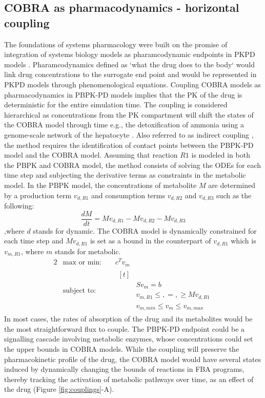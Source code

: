 \subsection{COBRA as pharmacodynamics - horizontal coupling}
The foundations of systems pharmacology were built on the promise of integration of systems biology models as pharamcodynamic endpoints in PKPD models \cite{iyengar2012merging,danhof2016systems}. Pharamcodynamics defined as `what the drug does to the body` would link drug concentrations to the surrogate end point and would be represented in PKPD models through phenomenological equations. Coupling COBRA models as pharmacodynamics in PBPK-PD models implies that the PK of the drug is deterministic for the entire simulation time. The coupling is considered hierarchical as concentrations from the PK compartment will shift the states of the COBRA model through time e.g., the detoxification of ammonia using a genome-scale network of the hepatocyte \cite{krauss2012integrating}. Also referred to as indirect coupling \cite{krauss2012integrating}, the method requires the identification of contact points between the PBPK-PD model and the COBRA model. Assuming that reaction $R1$ is modeled in both the PBPK and COBRA model, the method consists of solving the ODEs for each time step and subjecting the derivative terms as constraints in the metabolic model. In the PBPK model, the concentrations of metabolite $M$ are determined by a production term $v_{d,R1}$ and consumption terms $v_{d,R2}$ and $v_{d,R3}$ such as the following:
\begin{equation} \label{intro:eq1}
\frac{dM}{dt}=Mv_{d,R1}-Mv_{d,R2}-Mv_{d,R3}
\end{equation}
,where $d$ stands for dynamic.
The COBRA model is dynamically constrained for each time step and $Mv_{d,R1}$ is set as a bound in the counterpart of $v_{d,R1}$ which is $v_{m,R1}$, where $m$ stands for metabolic.
\begin{alignat*}{2}
  & \text{max or min: } &  & c^{T}v_m\\
  & \text{subject to: } &  &  
                \begin{aligned}[t] \\
                & Sv_{m}=b \\
                & v_{m,R1} \leq,=,\geq Mv_{d,R1}\\
                & v_{m,min} \leq v_{m}  \leq  v_{m,max}
                \end{aligned}
\end{alignat*} 
In most cases, the rates of absorption of the drug and its metabolites would be the most straightforward flux to couple. The PBPK-PD endpoint could be a signalling cascade involving metabolic enzymes, whose concentrations could set the upper bounds in COBRA models. While the coupling will preserve the pharmacokinetic profile of the drug, the COBRA model would have several states induced by dynamically changing the bounds of reactions in FBA programs, thereby tracking the activation of metabolic pathways over time, as an effect of the drug (Figure \ref{fig:couplings}-A). 
